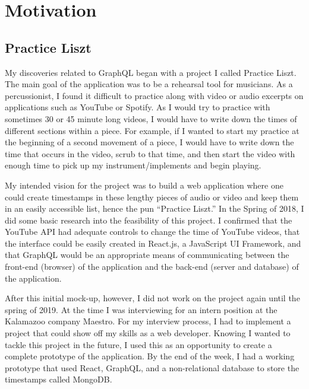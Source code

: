 \section{Motivation} \label{sec:motivation}

\subsection{Practice Liszt}
My discoveries related to GraphQL began with a project I called Practice Liszt.  The main goal of the application was to be a rehearsal tool for musicians. As a percussionist, I found it difficult to practice along with video or audio excerpts on applications such as YouTube or Spotify.  As I would try to practice with sometimes 30 or 45 minute long videos, I would have to write down the times of different sections within a piece.  For example, if I wanted to start my practice at the beginning of a second movement of a piece, I would have to write down the time that occurs in the video, scrub to that time, and then start the video with enough time to pick up my instrument/implements and begin playing.

My intended vision for the project was to build a web application where one could create timestamps in these lengthy pieces of audio or video and keep them in an easily accessible list, hence the pun ``Practice Liszt.'' In the Spring of 2018, I did some basic research into the feasibility of this project.  I confirmed that the YouTube API had adequate controls to change the time of YouTube videos, that the interface could be easily created in React.js, a JavaScript UI Framework, and that GraphQL would be an appropriate means of communicating between the front-end (browser) of the application and the back-end (server and database) of the application.

After this initial mock-up, however, I did not work on the project again until the spring of 2019.  At the time I was interviewing for an intern position at the Kalamazoo company Maestro.  For my interview process, I had to implement a project that could show off my skills as a web developer.  Knowing I wanted to tackle this project in the future, I used this as an opportunity to create a complete prototype of the application.  By the end of the week, I had a working prototype that used React, GraphQL, and a non-relational database to store the timestamps called MongoDB.

